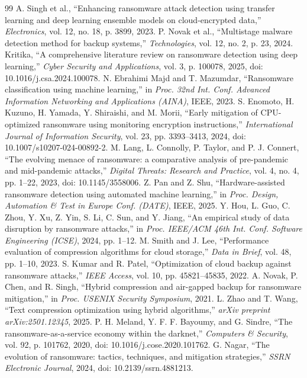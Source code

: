\documentclass{iaesarticle}
\begin{document}
\begin{thebibliography}{99}
 A. Singh et al., ``Enhancing ransomware attack detection using transfer learning and deep learning ensemble models on cloud-encrypted data,'' \textsl{Electronics}, vol. 12, no. 18, p. 3899, 2023.
 P. Novak et al., ``Multistage malware detection method for backup systems,'' \textsl{Technologies}, vol. 12, no. 2, p. 23, 2024.
 Kritika, ``A comprehensive literature review on ransomware detection using deep learning,'' \textsl{Cyber Security and Applications}, vol. 3, p. 100078, 2025, doi: 10.1016/j.csa.2024.100078.
 N. Ebrahimi Majd and T. Mazumdar, ``Ransomware classification using machine learning,'' in \textsl{Proc. 32nd Int. Conf. Advanced Information Networking and Applications (AINA)}, IEEE, 2023.
 S. Enomoto, H. Kuzuno, H. Yamada, Y. Shiraishi, and M. Morii, ``Early mitigation of CPU-optimized ransomware using monitoring encryption instructions,'' \textsl{International Journal of Information Security}, vol. 23, pp. 3393--3413, 2024, doi: 10.1007/s10207-024-00892-2.
 M. Lang, L. Connolly, P. Taylor, and P. J. Connert, ``The evolving menace of ransomware: a comparative analysis of pre-pandemic and mid-pandemic attacks,'' \textsl{Digital Threats: Research and Practice}, vol. 4, no. 4, pp. 1--22, 2023, doi: 10.1145/3558006.
 Z. Pan and Z. Shu, ``Hardware-assisted ransomware detection using automated machine learning,'' in \textsl{Proc. Design, Automation \& Test in Europe Conf. (DATE)}, IEEE, 2025.
 Y. Hou, L. Guo, C. Zhou, Y. Xu, Z. Yin, S. Li, C. Sun, and Y. Jiang, ``An empirical study of data disruption by ransomware attacks,'' in \textsl{Proc. IEEE/ACM 46th Int. Conf. Software Engineering (ICSE)}, 2024, pp. 1--12.
 M. Smith and J. Lee, ``Performance evaluation of compression algorithms for cloud storage,'' \textsl{Data in Brief}, vol. 48, pp. 1--10, 2023.
 S. Kumar and R. Patel, ``Optimization of cloud backup against ransomware attacks,'' \textsl{IEEE Access}, vol. 10, pp. 45821--45835, 2022.
 A. Novak, P. Chen, and R. Singh, ``Hybrid compression and air-gapped backup for ransomware mitigation,'' in \textsl{Proc. USENIX Security Symposium}, 2021.
 L. Zhao and T. Wang, ``Text compression optimization using hybrid algorithms,'' \textsl{arXiv preprint arXiv:2501.12345}, 2025.
 P. H. Meland, Y. F. F. Bayoumy, and G. Sindre, ``The ransomware-as-a-service economy within the darknet,'' \textsl{Computers \& Security}, vol. 92, p. 101762, 2020, doi: 10.1016/j.cose.2020.101762.
 G. Nagar, ``The evolution of ransomware: tactics, techniques, and mitigation strategies,'' \textsl{SSRN Electronic Journal}, 2024, doi: 10.2139/ssrn.4881213.

\end{thebibliography}
\end{document}
